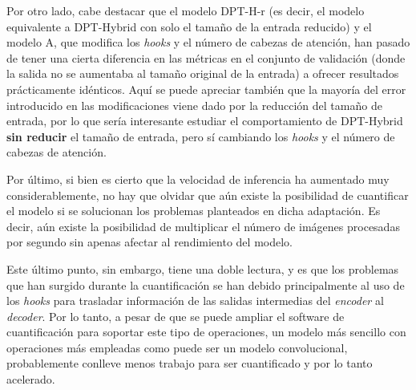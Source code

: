 Por otro lado, cabe destacar que el modelo DPT-H-r (es decir, el modelo equivalente a DPT-Hybrid con solo el tamaño de la entrada reducido) y el modelo A, que modifica los \textit{hooks} y el número de cabezas de atención, han pasado de tener una cierta diferencia en las métricas en el conjunto de validación (donde la salida no se aumentaba al tamaño original de la entrada) a ofrecer resultados prácticamente idénticos. Aquí se puede apreciar también que la mayoría del error introducido en las modificaciones viene dado por la reducción del tamaño de entrada, por lo que sería interesante estudiar el comportamiento de DPT-Hybrid \textbf{sin reducir} el tamaño de entrada, pero sí cambiando los \textit{hooks} y el número de cabezas de atención.

Por último, si bien es cierto que la velocidad de inferencia ha aumentado muy considerablemente, no hay que olvidar que aún existe la posibilidad de cuantificar el modelo si se solucionan los problemas planteados en dicha adaptación. Es decir, aún existe la posibilidad de multiplicar el número de imágenes procesadas por segundo sin apenas afectar al rendimiento del modelo. 

Este último punto, sin embargo, tiene una doble lectura, y es que los problemas que han surgido durante la cuantificación se han debido principalmente al uso de los \textit{hooks} para trasladar información de las salidas intermedias del \textit{encoder} al \textit{decoder}. Por lo tanto, a pesar de que se puede ampliar el software de cuantificación para soportar este tipo de operaciones, un modelo más sencillo con operaciones más empleadas como puede ser un modelo convolucional, probablemente conlleve menos trabajo para ser cuantificado y por lo tanto acelerado.


\clearpage

  
  


